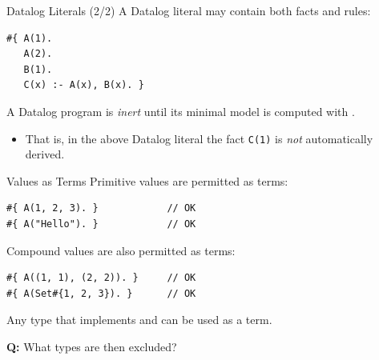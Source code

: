 
\begin{frame}[fragile]{Datalog Literals (2/2)}
A Datalog literal may contain both facts and rules:

\begin{lstlisting}[language=flix, xleftmargin=0.8cm]
#{ A(1). 
   A(2). 
   B(1).
   C(x) :- A(x), B(x). }
\end{lstlisting}

A Datalog program is \emph{inert} until its minimal model is computed with
. 

\begin{itemize}
    \item That is, in the above Datalog literal the fact \lstinline{C(1)} is
    \emph{not} automatically derived.
\end{itemize}
\end{frame}

\begin{frame}[fragile]{Values as Terms}
Primitive values are permitted as terms:

\begin{lstlisting}[language=flix, xleftmargin=0.8cm]
#{ A(1, 2, 3). }            // OK
#{ A("Hello"). }            // OK
\end{lstlisting}

\pause

Compound values are also permitted as terms:

\begin{lstlisting}[language=flix, xleftmargin=0.8cm]
#{ A((1, 1), (2, 2)). }     // OK
#{ A(Set#{1, 2, 3}). }      // OK
\end{lstlisting}

Any type that implements  and  can be used as a
term.

\pause

\textbf{Q:} What types are then excluded?
\end{frame}

